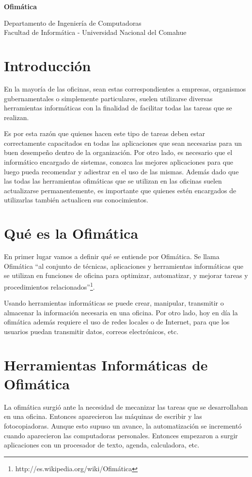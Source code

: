 \documentclass[12pt]{article}
\def\maketitle{

\makeatletter
{\color{bl} \centering \huge \sc \textbf{
Ofimática\\
 \vspace*{8pt} }\par}
 \makeatother


 \makeatletter
 {\centering \small 
 	Departamento de Ingeniería de Computadoras \\
 	Facultad de Informática - Universidad Nacional del Comahue \\
 	\vspace{20pt} }
 \makeatother

}
\begin{document}
\thispagestyle{empty}
\maketitle
\setlength{\parindent}{0pt}


\section*{Introducción}

En la mayoría de las oficinas, sean estas correspondientes a empresas, organismos gubernamentales o simplemente particulares, suelen utilizarse diversas herramientas informáticas con la finalidad de facilitar todas las tareas que se realizan.

Es por esta razón que quienes hacen este tipo de tareas deben estar correctamente capacitados en todas las aplicaciones que sean necesarias para un buen desempeño dentro de la organización. Por otro lado, es necesario que el informático encargado de sistemas, conozca las mejores aplicaciones para que luego pueda recomendar y adiestrar en el uso de las mismas. Además dado que las todas las herramientas ofimáticas que se utilizan en las oficinas suelen actualizarse permanentemente, es importante que quienes estén encargados de utilizarlas también actualicen sus conocimientos.


\section*{Qué es la Ofimática}

En primer lugar vamos a definir qué se entiende por Ofimática. Se llama Ofimática “al conjunto de técnicas, aplicaciones y herramientas informáticas que se utilizan en funciones de oficina para optimizar, automatizar, y mejorar tareas y procedimientos relacionados”\footnote{http://es.wikipedia.org/wiki/Ofimática}.

Usando herramientas informáticas se puede crear, manipular, transmitir o almacenar la información necesaria en una oficina. Por otro lado, hoy en día la ofimática además requiere el uso de redes locales o de Internet, para que los usuarios puedan transmitir datos, correos electrónicos, etc.

\section*{Herramientas Informáticas de Ofimática}

La ofimática surgió ante la necesidad de mecanizar las tareas que se desarrollaban en una oficina. Entonces aparecieron las máquinas de escribir y las fotocopiadoras. Aunque esto supuso un avance, la automatización se incrementó cuando aparecieron las computadoras personales. Entonces empezaron a surgir aplicaciones con un procesador de texto, agenda, calculadora, etc. 
\end{document}
